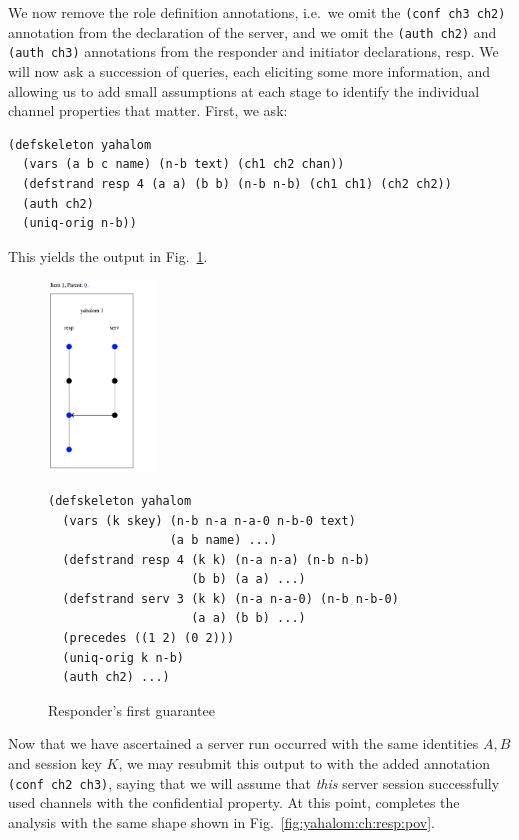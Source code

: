 We now remove the role definition annotations, i.e.~we omit the
\texttt{(conf ch3 ch2)} annotation from the declaration of the server,
and we omit the \texttt{(auth ch2)} and \texttt{(auth ch3)}
annotations from the responder and initiator declarations, resp.  We
will now ask a succession of queries, each eliciting some more
information, and allowing us to add small assumptions at each stage to
identify the individual channel properties that matter.  First, we
ask:
%
{\small
\begin{verbatim}(defskeleton yahalom
  (vars (a b c name) (n-b text) (ch1 ch2 chan))
  (defstrand resp 4 (a a) (b b) (n-b n-b) (ch1 ch1) (ch2 ch2))
  (auth ch2)
  (uniq-orig n-b))\end{verbatim}}
%
This yields the output in Fig.~\ref{fig:yahalom:q:resp:pov:1}.
%
\begin{figure}
  \begin{minipage}[c][2in][c]{.25\linewidth}
    \includegraphics[height=2in]{yahalom_q_resp_pov1.png}
  \end{minipage}
  \begin{minipage}[c][2in][c]{.7\linewidth}\small
\begin{verbatim}(defskeleton yahalom
  (vars (k skey) (n-b n-a n-a-0 n-b-0 text)
                 (a b name) ...)
  (defstrand resp 4 (k k) (n-a n-a) (n-b n-b)
                    (b b) (a a) ...)
  (defstrand serv 3 (k k) (n-a n-a-0) (n-b n-b-0)
                    (a a) (b b) ...)
  (precedes ((1 2) (0 2)))
  (uniq-orig k n-b)
  (auth ch2) ...) \end{verbatim}
  \end{minipage}
  \caption{Responder's first guarantee}
  \label{fig:yahalom:q:resp:pov:1}
\end{figure}

Now that we have ascertained a server run occurred with the same
identities $A,B$ and session key $K$, we may resubmit this output to
{\cpsa} with the added annotation \texttt{(conf ch2 ch3)}, saying that
we will assume that \emph{this} server session successfully used
channels with the confidential property.  At this point, {\cpsa}
completes the analysis with the same shape shown in
Fig.~\ref{fig:yahalom:ch:resp:pov}.


